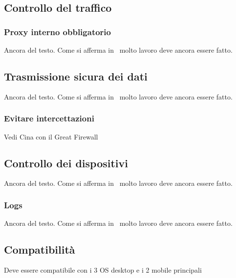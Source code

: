 \subsection{Controllo del traffico}
\subsubsection{Proxy interno obbligatorio}
Ancora del testo. Come si afferma in~\cite{jones96analysis} molto lavoro deve ancora essere fatto.

\subsection{Trasmissione sicura dei dati}
Ancora del testo. Come si afferma in~\cite{jones96analysis} molto lavoro deve ancora essere fatto.
\subsubsection{Evitare intercettazioni}
Vedi Cina con il Great Firewall

\subsection{Controllo dei dispositivi}
Ancora del testo. Come si afferma in~\cite{jones96analysis} molto lavoro deve ancora essere fatto.
\subsubsection{Logs}
Ancora del testo. Come si afferma in~\cite{jones96analysis} molto lavoro deve ancora essere fatto.

\subsection{Compatibilità}
Deve essere compatibile con i 3 OS desktop e i 2 mobile principali